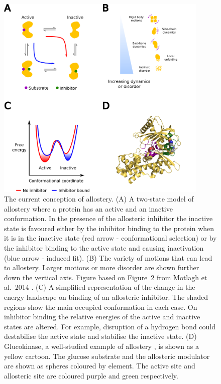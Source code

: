 \begin{figure}
\centering

\includegraphics[width=0.9\textwidth]{figures/allostery/allostery}

\caption[The current conception of allostery as a property of the conformational ensemble]
{The current conception of allostery.
(A) A two-state model of allostery where a protein has an active and an inactive conformation.
In the presence of the allosteric inhibitor the inactive state is favoured either by the inhibitor binding to the protein when it is in the inactive state (red arrow - conformational selection) or by the inhibitor binding to the active state and causing inactivation (blue arrow - induced fit).
(B) The variety of motions that can lead to allostery.
Larger motions or more disorder are shown further down the vertical axis.
Figure based on Figure~2 from Motlagh et al.\ 2014 \cite{Motlagh2014}.
(C) A simplified representation of the change in the energy landscape on binding of an allosteric inhibitor.
The shaded regions show the main occupied conformation in each case.
On inhibitor binding the relative energies of the active and inactive states are altered.
For example, disruption of a hydrogen bond could destabilise the active state and stabilise the inactive state.
(D) Glucokinase, a well-studied example of allostery \cite{Kamata2004}, is shown as a yellow cartoon.
The glucose substrate and the allosteric modulator are shown as spheres coloured by element.
The active site and allosteric site are coloured purple and green respectively.}

\label{fig:allostery}
\end{figure}


